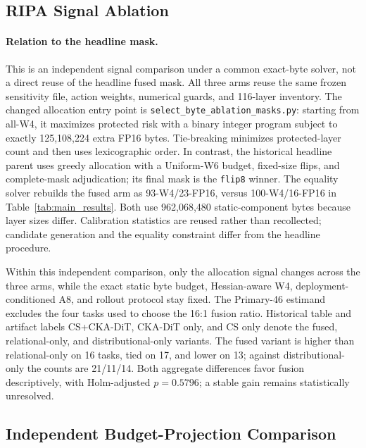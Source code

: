 \subsection{RIPA Signal Ablation}
\label{sec:signal_ablation}



\paragraph{Relation to the headline mask.}
This is an independent signal comparison under a common exact-byte solver, not a direct reuse of the headline fused mask. All three arms reuse the same frozen sensitivity file, action weights, numerical guards, and 116-layer inventory. The changed allocation entry point is \texttt{select\_byte\_ablation\_masks.py}: starting from all-W4, it maximizes protected risk with a binary integer program subject to exactly 125,108,224 extra FP16 bytes. Tie-breaking minimizes protected-layer count and then uses lexicographic order. In contrast, the historical headline parent uses greedy allocation with a Uniform-W6 budget, fixed-size flips, and complete-mask adjudication; its final mask is the \texttt{flip8} winner. The equality solver rebuilds the fused arm as 93-W4/23-FP16, versus 100-W4/16-FP16 in Table~\ref{tab:main_results}. Both use 962,068,480 static-component bytes because layer sizes differ. Calibration statistics are reused rather than recollected; candidate generation and the equality constraint differ from the headline procedure.

Within this independent comparison, only the allocation signal changes across the three arms, while the exact static byte budget, Hessian-aware W4, deployment-conditioned A8, and rollout protocol stay fixed. The Primary-46 estimand excludes the four tasks used to choose the 16:1 fusion ratio. Historical table and artifact labels CS+CKA-DiT, CKA-DiT only, and CS only denote the fused, relational-only, and distributional-only variants. The fused variant is higher than relational-only on 16 tasks, tied on 17, and lower on 13; against distributional-only the counts are 21/11/14. Both aggregate differences favor fusion descriptively, with Holm-adjusted $p=0.5796$; a stable gain remains statistically unresolved.

\subsection{Independent Budget-Projection Comparison}
\label{sec:projection_comparison}

